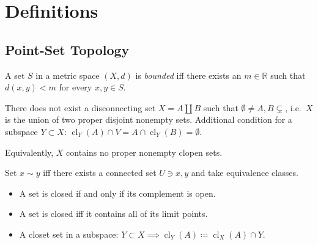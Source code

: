 \hypertarget{definitions}{%
\section{Definitions}\label{definitions}}

\hypertarget{point-set-topology}{%
\subsection{Point-Set Topology}\label{point-set-topology}}

\begin{definition}[Bounded]

A set \(S\) in a metric space \((X, d)\) is \emph{bounded} iff there
exists an \(m\in {\mathbb{R}}\) such that \(d(x, y) < m\) for every
\(x, y\in S\).

\end{definition}

\begin{definition}[Connected]

There does not exist a disconnecting set \(X = A{\coprod}B\) such that
\(\emptyset \neq A, B \subsetneq\), i.e.~\(X\) is the union of two
proper disjoint nonempty sets. Additional condition for a subspace
\(Y\subset X\):
\(\operatorname{cl}_{Y}(A) \cap V = A \cap\operatorname{cl}_{Y}(B) = \emptyset\).

Equivalently, \(X\) contains no proper nonempty clopen sets.

\end{definition}

\begin{definition}

Set \(x\sim y\) iff there exists a connected set \(U\ni x, y\) and take
equivalence classes.

\end{definition}

\begin{definition}

\envlist

\begin{itemize}
\tightlist
\item
  A set is closed if and only if its complement is open.
\item
  A set is closed iff it contains all of its limit points.
\item
  A closet set in a subspace:
  \(Y\subset X \implies \operatorname{cl}_{Y}(A) \coloneqq\operatorname{cl}_{X}(A)\cap Y\).
\end{itemize}

\end{definition}

